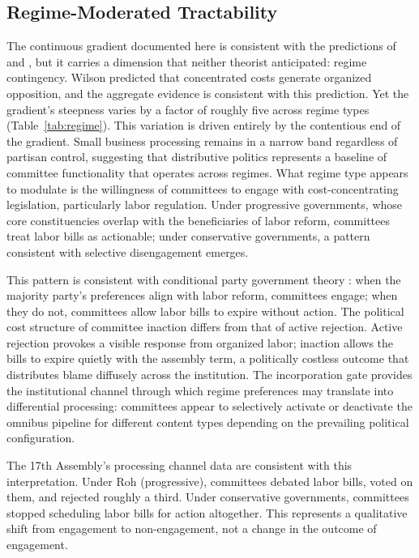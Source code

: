 \documentclass[11pt]{article}
\begin{document}
\subsection{Regime-Moderated Tractability}

The continuous gradient documented here is consistent with the predictions of \citet{lowi1964} and \citet{wilson1980}, but it carries a dimension that neither theorist anticipated: regime contingency. Wilson predicted that concentrated costs generate organized opposition, and the aggregate evidence is consistent with this prediction. Yet the gradient's steepness varies by a factor of roughly five across regime types (Table~\ref{tab:regime}). This variation is driven entirely by the contentious end of the gradient. Small business processing remains in a narrow band regardless of partisan control, suggesting that distributive politics represents a baseline of committee functionality that operates across regimes. What regime type appears to modulate is the willingness of committees to engage with cost-concentrating legislation, particularly labor regulation. Under progressive governments, whose core constituencies overlap with the beneficiaries of labor reform, committees treat labor bills as actionable; under conservative governments, a pattern consistent with selective disengagement emerges.

This pattern is consistent with conditional party government theory \citep{aldrich2001,cox2005}: when the majority party's preferences align with labor reform, committees engage; when they do not, committees allow labor bills to expire without action. The political cost structure of committee inaction differs from that of active rejection. Active rejection provokes a visible response from organized labor; inaction allows the bills to expire quietly with the assembly term, a politically costless outcome that distributes blame diffusely across the institution. The incorporation gate provides the institutional channel through which regime preferences may translate into differential processing: committees appear to selectively activate or deactivate the omnibus pipeline for different content types depending on the prevailing political configuration.

The 17th Assembly's processing channel data are consistent with this interpretation. Under Roh (progressive), committees debated labor bills, voted on them, and rejected roughly a third. Under conservative governments, committees stopped scheduling labor bills for action altogether. This represents a qualitative shift from engagement to non-engagement, not a change in the outcome of engagement.
\end{document}
